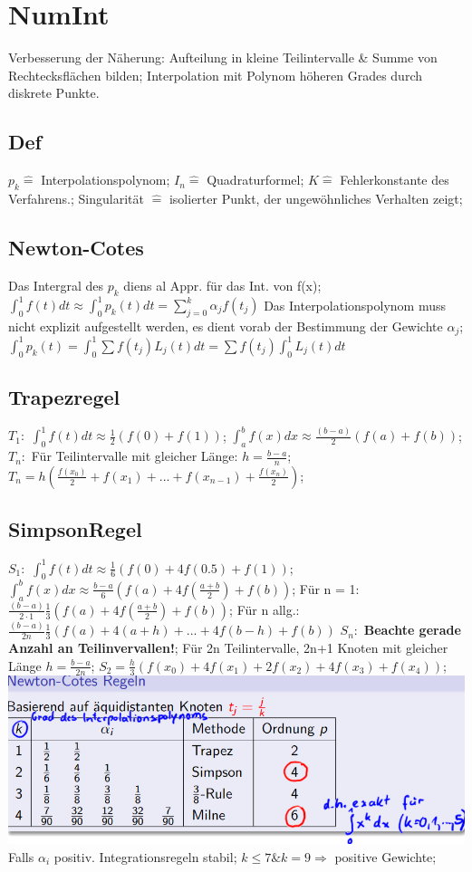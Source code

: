 \section{NumInt}
Verbesserung der Näherung: Aufteilung in kleine Teilintervalle \& Summe von Rechtecksflächen bilden; Interpolation mit Polynom höheren Grades durch diskrete Punkte.
\subsection{Def}
$ p_{k} \hat{=} $ Interpolationspolynom; 
$ I_{n} \hat{=} $ Quadraturformel; 
$ K \hat{=} $ Fehlerkonstante des Verfahrens.; 
Singularität $\hat{=}$ isolierter Punkt, der ungewöhnliches Verhalten zeigt; 

\subsection{Newton-Cotes}
Das Intergral des $ p_{k} $ diens al Appr. für das Int. von f(x); 
$ \int_{0}^{1} f(t) dt \approx \int_{0}^{1} p_{k} (t) dt =  \sum_{j=0}^{k} \alpha_j f( t_{j} ) $ Das Interpolationspolynom muss nicht explizit aufgestellt werden, es dient vorab der Bestimmung der Gewichte $ \alpha_{j} $; 
$ \int_{0}^{1} p_{k}(t) = \int_{0}^{1} \sum f( t_{j} ) L_{j} (t) dt = \sum f ( t_{j} ) \int_{0}^{1} L_{j} (t) dt $
\subsection{Trapezregel}
$ T_{1}: $ 
$ \int_{0}^{1} f (t) dt \approx \frac{1}{2} ( f(0) + f(1) ) $; 
$ \int_{a}^{b} f (x) dx \approx \frac{(b-a)}{2} (f(a) + f(b) ) $;\\
$ T_{n}: $
Für Teilintervalle mit gleicher Länge: $ h = \frac{b-a}{n} $;  
$ T_{n} = h (\frac{ f ( x_{0} ) }{2} + f(x_{1}) + ... + f(x_{n-1}) + \frac{ f(x_n) }{2} ) $; 
\subsection{SimpsonRegel}
$ S_{1}: $ 
$ \int_{0}^{1} f (t) dt \approx \frac{1}{6} ( f(0) + 4f(0.5) + f(1) ) $; 
$\int_{a}^{b} f (x) dx \approx \frac{b-a}{6} ( f(a) + 4f( \frac{a+b}{2}) + f(b) ) $; 
Für n = 1: $\frac{( b-a )}{2\cdot1} \frac{1}{3} ( f(a) + 4f( \frac{a+b}{2}) + f(b) ) $; 
Für n allg.: $ \frac{( b-a) }{2n}\frac{1}{3} ( f(a) + 4(a+h) + ... + 4f(b-h)+ f(b) ) $ 
$ S_{n}:$ 
\textbf{Beachte gerade Anzahl an Teilinvervallen!}; 
Für 2n Teilintervalle, 2n+1 Knoten mit gleicher Länge $ h = \frac{ b-a }{2n} $; 
$ S_{2} = \frac{h}{3} ( f(x_{0}) + 4f(x_{1}) + 2f(x_{2}) + 4f(x_{3}) + f(x_{4}) ) $; 
\includegraphics[scale=0.25]{./pic/NewtonCodesRegeln.png}
Falls $\alpha_{i} $ positiv. Integrationsregeln stabil; 
$ k \le 7 \& k =9 \Rightarrow $ positive Gewichte;
